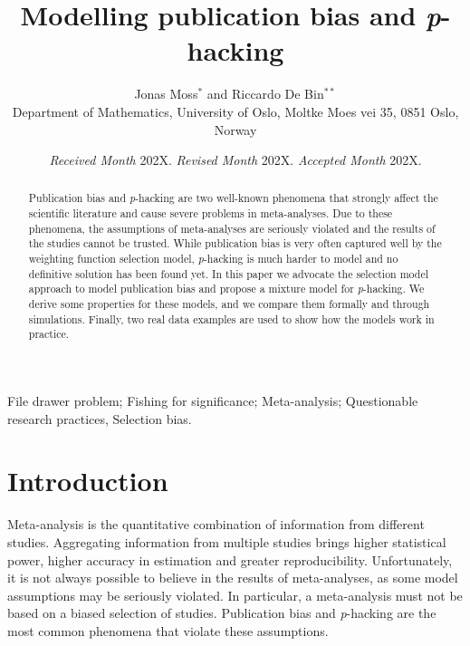 \documentclass[useAMS,usenatbib,referee]{biom}
\author{Jonas Moss$^{*}$\email{jonas.moss.statistics@gmail.com} and
Riccardo De Bin$^{**}$\email{debin@math.uio.no}\\
Department of Mathematics, University of Oslo, Moltke Moes vei 35, 0851 Oslo, Norway}
\title[Modelling publication bias and \textit{p}-hacking]{Modelling publication bias and \textit{p}-hacking}
\begin{document}
\date{{\it Received Month} 202X. {\it Revised Month} 202X.  {\it Accepted Month} 202X.}

\pagerange{\pageref{firstpage}--\pageref{lastpage}} 


\label{firstpage}

\begin{abstract}
Publication bias and \textit{p}-hacking are two well-known phenomena that strongly affect the scientific literature and cause severe problems in meta-analyses. Due to these phenomena, the assumptions of meta-analyses are seriously violated and the results of the studies cannot be trusted. While publication bias is very often captured well by the weighting function selection model, \textit{p}-hacking is much harder to model and no definitive solution has been found yet. In this paper we advocate the selection model approach to model publication bias and propose a mixture model for \textit{p}-hacking. We derive some properties for these models, and we compare them formally and through simulations. Finally, two real data examples are used to show how the models work in practice.
\end{abstract}

\begin{keywords}
File drawer problem; Fishing for significance; Meta-analysis; Questionable research practices, Selection bias.
\end{keywords}

\maketitle

\section{Introduction}

Meta-analysis is the quantitative combination of information from different studies. Aggregating information from multiple studies brings higher statistical power, higher accuracy in estimation and greater reproducibility. Unfortunately, it is not always possible to believe in the results of meta-analyses, as some model assumptions may be seriously violated. In particular, a meta-analysis must not be based on a biased selection of studies. Publication bias \citep{sterling1959publication} and \textit{p}-hacking \citep{simmons2011false} are the most common phenomena that violate these assumptions. 
\end{document}
